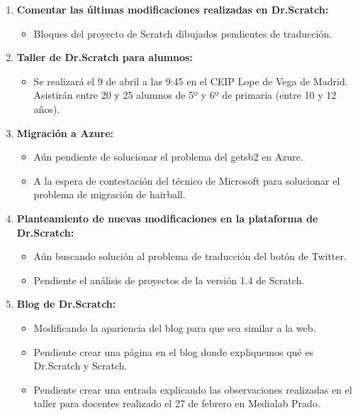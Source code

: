 \documentclass[a4paper,12pt]{letter}
\begin{document}
\begin{letter}
\begin{enumerate}
    
    \item {\textbf {Comentar las últimas modificaciones realizadas en Dr.Scratch:}}
    \begin{itemize}
        \item {Bloques del proyecto de Scratch dibujados pendientes de traducción.}
    \end{itemize}

    \item {\textbf {Taller de Dr.Scratch para alumnos:}}
    \begin{itemize}
        \item {Se realizará el 9 de abril a las 9:45 en el CEIP Lope de Vega de Madrid. Asistirán entre 20 y 25 alumnos de 5º y 6º de primaria (entre 10 y 12 años).}
    \end{itemize}

    \item{\textbf {Migración a Azure:}}
    \begin{itemize}
        \item {Aún pendiente de solucionar el problema del getsb2 en Azure.}
        \item {A la espera de contestación del técnico de Microsoft para solucionar el problema de migración de hairball.}
    \end{itemize}
	\item{\textbf {Planteamiento de nuevas modificaciones en la plataforma de Dr.Scratch:}}
    \begin{itemize}
        \item {Aún buscando solución al problema de traducción del botón de Twitter.}
        \item {Pendiente el análisis de proyectos de la versión 1.4 de Scratch.}
    \end{itemize}

    \item{\textbf {Blog de Dr.Scratch:}}
    \begin{itemize}
        \item {Modificando la apariencia del blog para que sea similar a la web.}
        \item {Pendiente crear una página en el blog donde expliquemos qué es Dr.Scratch y Scratch.}
        \item {Pendiente crear una entrada explicando las observaciones realizadas en el taller para docentes realizado el 27 de febrero en Medialab Prado.}
    \end{itemize}

\end{enumerate}


\end{letter}
\end{document}
